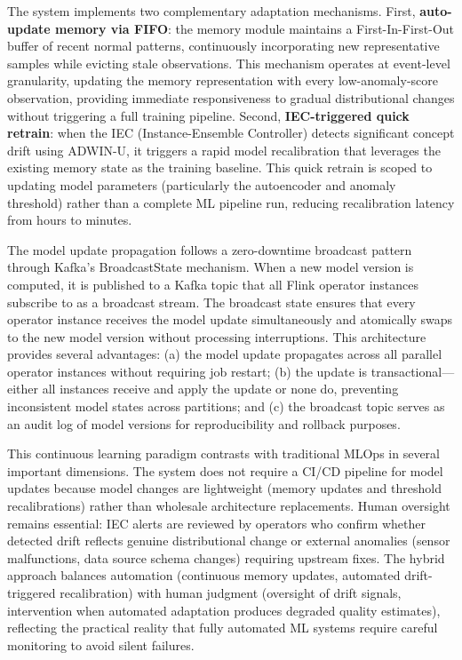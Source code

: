 The system implements two complementary adaptation mechanisms. First, \textbf{auto-update memory via FIFO}: the memory module maintains a First-In-First-Out buffer of recent normal patterns, continuously incorporating new representative samples while evicting stale observations. This mechanism operates at event-level granularity, updating the memory representation with every low-anomaly-score observation, providing immediate responsiveness to gradual distributional changes without triggering a full training pipeline. Second, \textbf{IEC-triggered quick retrain}: when the IEC (Instance-Ensemble Controller) detects significant concept drift using ADWIN-U, it triggers a rapid model recalibration that leverages the existing memory state as the training baseline. This quick retrain is scoped to updating model parameters (particularly the autoencoder and anomaly threshold) rather than a complete ML pipeline run, reducing recalibration latency from hours to minutes.

The model update propagation follows a zero-downtime broadcast pattern through Kafka's BroadcastState mechanism. When a new model version is computed, it is published to a Kafka topic that all Flink operator instances subscribe to as a broadcast stream. The broadcast state ensures that every operator instance receives the model update simultaneously and atomically swaps to the new model version without processing interruptions. This architecture provides several advantages: (a) the model update propagates across all parallel operator instances without requiring job restart; (b) the update is transactional---either all instances receive and apply the update or none do, preventing inconsistent model states across partitions; and (c) the broadcast topic serves as an audit log of model versions for reproducibility and rollback purposes.

This continuous learning paradigm contrasts with traditional MLOps in several important dimensions. The system does not require a CI/CD pipeline for model updates because model changes are lightweight (memory updates and threshold recalibrations) rather than wholesale architecture replacements. Human oversight remains essential: IEC alerts are reviewed by operators who confirm whether detected drift reflects genuine distributional change or external anomalies (sensor malfunctions, data source schema changes) requiring upstream fixes. The hybrid approach balances automation (continuous memory updates, automated drift-triggered recalibration) with human judgment (oversight of drift signals, intervention when automated adaptation produces degraded quality estimates), reflecting the practical reality that fully automated ML systems require careful monitoring to avoid silent failures.

